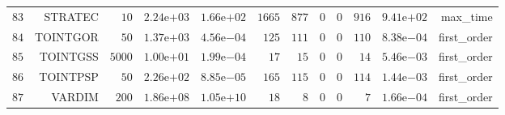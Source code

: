 \begin{longtable}{rrrrrrrrrrrr}
  \(    83\) & STRATEC & \(    10\) & \( 2.24\)e\(+03\) & \( 1.66\)e\(+02\) & \(  1665\) & \(   877\) & \(     0\) & \(     0\) & \(   916\) & \( 9.41\)e\(+02\) & max\_time \\
  \(    84\) & TOINTGOR & \(    50\) & \( 1.37\)e\(+03\) & \( 4.56\)e\(-04\) & \(   125\) & \(   111\) & \(     0\) & \(     0\) & \(   110\) & \( 8.38\)e\(-04\) & first\_order \\
  \(    85\) & TOINTGSS & \(  5000\) & \( 1.00\)e\(+01\) & \( 1.99\)e\(-04\) & \(    17\) & \(    15\) & \(     0\) & \(     0\) & \(    14\) & \( 5.46\)e\(-03\) & first\_order \\
  \(    86\) & TOINTPSP & \(    50\) & \( 2.26\)e\(+02\) & \( 8.85\)e\(-05\) & \(   165\) & \(   115\) & \(     0\) & \(     0\) & \(   114\) & \( 1.44\)e\(-03\) & first\_order \\
  \(    87\) & VARDIM & \(   200\) & \( 1.86\)e\(+08\) & \( 1.05\)e\(+10\) & \(    18\) & \(     8\) & \(     0\) & \(     0\) & \(     7\) & \( 1.66\)e\(-04\) & first\_order \\\hline
\end{longtable}
